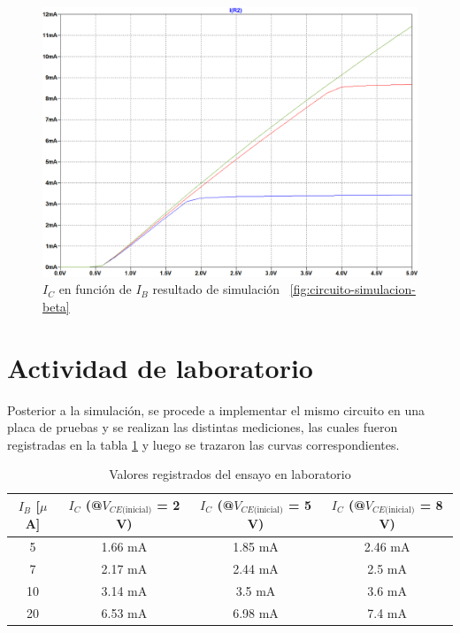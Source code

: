 \documentclass[chaptersright]{informeutn}
\begin{document}
      \begin{figure}[H]
          \centering
          \includegraphics[width=1\textwidth, keepaspectratio]{pictures/curva-simulacion-beta.png}
          \caption{$I_C$ en función de $I_B$ resultado de simulación 
          ~\ref{fig:circuito-simulacion-beta}}
          \label{fig:curva-simulacion-beta}
      \end{figure}

  \section{Actividad de laboratorio}
  Posterior a la simulación, se procede a implementar el mismo circuito en una
  placa de pruebas y se realizan las distintas mediciones, las cuales fueron
  registradas en la tabla \ref{fig:tabla-beta} y luego se trazaron las curvas
  correspondientes.
    \begin{table}[H]
      \centering
      \begin{tabular}{|c|c|c|c|}
        \hline
        $I_B$ [$\mu$A] & $I_C$ (@$V_{CE\text{(inicial)}}$ = 2 V) & $I_C$ (@$V_{CE\text{(inicial)}}$ = 5 V) & $I_C$ (@$V_{CE\text{(inicial)}}$ = 8 V) \\
        \hline
        5  & 1.66 mA & 1.85 mA & 2.46 mA \\
        7  & 2.17 mA & 2.44 mA & 2.5 mA  \\
        10 & 3.14 mA & 3.5 mA  & 3.6 mA  \\
        20 & 6.53 mA & 6.98 mA & 7.4 mA  \\
        \hline
      \end{tabular}
      \caption{Valores registrados del ensayo en laboratorio}
      \label{fig:tabla-beta}
    \end{table}
\end{document}
